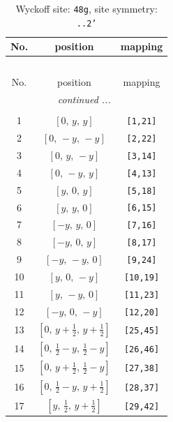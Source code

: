 \documentclass[fleqn,8pt]{jsarticle}
\begin{document}
\begin{longtable}{ccc}
\caption{Wyckoff site: {\tt 48g}, site symmetry: {\tt ..2'}}
 \\
 \hline \hline
No. & position & mapping \\ \hline \endfirsthead

\multicolumn{2}{l}{\tablename\ \thetable{}} \\
 \hline \hline
No. & position & mapping \\ \hline \endhead

 \hline \hline
\multicolumn{2}{r}{\footnotesize\it continued ...} \\ \endfoot

 \hline \hline
\multicolumn{2}{r}{} \\ \endlastfoot

1 & $\left[ 0,\, y,\, y \right]$ & {\tt [1,21]} \\ \hline
2 & $\left[ 0,\, - y,\, - y \right]$ & {\tt [2,22]} \\ \hline
3 & $\left[ 0,\, y,\, - y \right]$ & {\tt [3,14]} \\ \hline
4 & $\left[ 0,\, - y,\, y \right]$ & {\tt [4,13]} \\ \hline
5 & $\left[ y,\, 0,\, y \right]$ & {\tt [5,18]} \\ \hline
6 & $\left[ y,\, y,\, 0 \right]$ & {\tt [6,15]} \\ \hline
7 & $\left[ - y,\, y,\, 0 \right]$ & {\tt [7,16]} \\ \hline
8 & $\left[ - y,\, 0,\, y \right]$ & {\tt [8,17]} \\ \hline
9 & $\left[ - y,\, - y,\, 0 \right]$ & {\tt [9,24]} \\ \hline
10 & $\left[ y,\, 0,\, - y \right]$ & {\tt [10,19]} \\ \hline
11 & $\left[ y,\, - y,\, 0 \right]$ & {\tt [11,23]} \\ \hline
12 & $\left[ - y,\, 0,\, - y \right]$ & {\tt [12,20]} \\ \hline
13 & $\left[ 0,\, y + \frac{1}{2},\, y + \frac{1}{2} \right]$ & {\tt [25,45]} \\ \hline
14 & $\left[ 0,\, \frac{1}{2} - y,\, \frac{1}{2} - y \right]$ & {\tt [26,46]} \\ \hline
15 & $\left[ 0,\, y + \frac{1}{2},\, \frac{1}{2} - y \right]$ & {\tt [27,38]} \\ \hline
16 & $\left[ 0,\, \frac{1}{2} - y,\, y + \frac{1}{2} \right]$ & {\tt [28,37]} \\ \hline
17 & $\left[ y,\, \frac{1}{2},\, y + \frac{1}{2} \right]$ & {\tt [29,42]} \\ \hline

\end{longtable}
\end{document}
